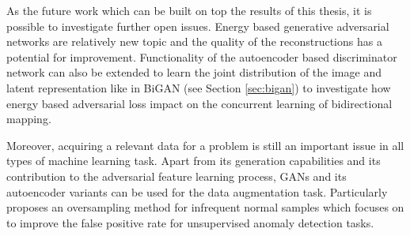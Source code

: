 As the future work which can be built on top the results of this thesis, it is possible to investigate 
further open issues. Energy based generative adversarial networks are relatively new topic and the 
quality of the reconstructions has a potential for improvement. Functionality of the autoencoder based 
discriminator network can also be extended to learn the joint distribution of the image and latent 
representation like in BiGAN (see Section \ref{sec:bigan}) to investigate how energy based adversarial 
loss impact on the concurrent learning of bidirectional mapping. 

Moreover, acquiring a relevant data for a problem is still an important issue in all types of machine 
learning task. Apart from its generation capabilities and its contribution to the adversarial feature 
learning process, GANs and its autoencoder variants can be used for the data augmentation task.
Particularly \cite{DBLP:journals/corr/abs-1808-07632} proposes an oversampling method for infrequent 
normal samples which focuses on to improve the false positive rate for unsupervised anomaly detection tasks. 

\endgroup
 
